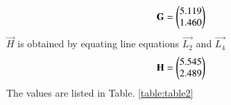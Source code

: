 \begin{enumerate}[label=\arabic*.,ref=\thesubsection.\theenumi]
\begin{align}
\mathbf{G}=\begin{pmatrix}5.119\\1.460\end{pmatrix}
\end{align}
$\vec{H}$ is obtained by equating line equations $\vec{L_2}$ and $\vec{L_4}$
\begin{align}
\mathbf{H}=\begin{pmatrix}5.545\\2.489\end{pmatrix}
\end{align}
The values are listed in 
Table. \ref{table:table2} 
\begin{table}[ht!]
\centering

\caption{Cyclic Quadrilateral EFGH}
\label{table:table2}


\end{table}
\end{enumerate}
